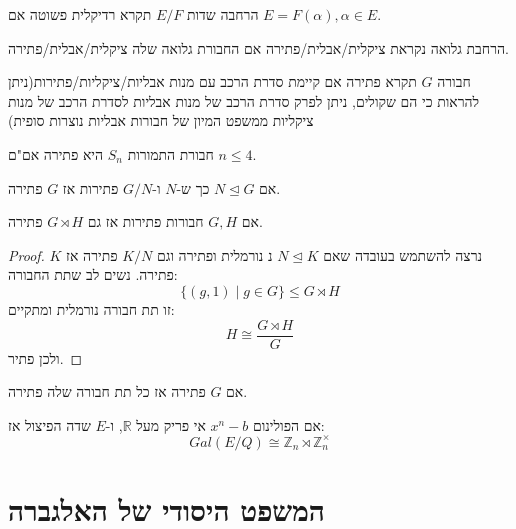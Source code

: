 \documentclass{tstextbook}
\begin{document}
\begin{definition}
הרחבה שדות \(E / F\) תקרא רדיקלית פשוטה אם \(E=F\left( \alpha \right),\alpha \in E\).

\end{definition}
\begin{definition}
הרחבת גלואה נקראת ציקלית/אבלית/פתירה אם החבורת גלואה שלה ציקלית/אבלית/פתירה.

\end{definition}
\begin{reminder}
חבורה \(G\) תקרא פתירה אם קיימת סדרת הרכב עם מנות אבליות/ציקליות/פתירות(ניתן להראות כי הם שקולים, ניתן לפרק סדרת הרכב של מנות אבליות לסדרת הרכב של מנות ציקליות ממשפט המיון של חבורות אבליות נוצרות סופית)

\end{reminder}
\begin{reminder}
חבורת התמורות \(S_{n}\) היא פתירה אם"ם \(n\leq 4\).

\end{reminder}
\begin{reminder}
אם \(N\trianglelefteq G\) כך ש-\(N\) ו-\(G / N\) פתירות אז \(G\) פתירה.

\end{reminder}
\begin{proposition}
אם \(G,H\) חבורות פתירות אז גם \(G\rtimes H\) פתירה.

\end{proposition}
\begin{proof}
נרצה להשתמש בעובדה שאם \(N \trianglelefteq K\) נ נורמלית ופתירה וגם \(K / N\) פתירה אז \(K\) פתירה.
נשים לב שתת החבורה:
$$\{(g,1)\mid g\in G\}\leq G\rtimes H$$
זו תת חבורה נורמלית ומתקיים:
$$H\cong{\frac{G\rtimes H}{G}}$$
ולכן פתיר.

\end{proof}
\begin{remark}
אם \(G\) פתירה אז כל תת חבורה שלה פתירה.

\end{remark}
\begin{theorem}
אם הפולינום \(x^{n}-b\) אי פריק מעל \(\mathbb{R}\), ו-\(E\) שדה הפיצול אז:
$$Gal(E / Q)\cong \mathbb{Z}_{n}\rtimes\mathbb{Z}_{n}^{\times}$$

\end{theorem}
\section{המשפט היסודי של האלגברה}
\end{document}
